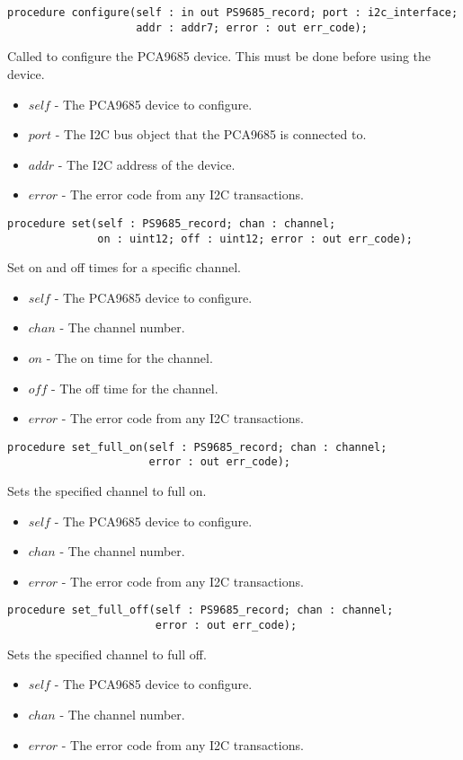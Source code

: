 \documentclass[10pt, openany]{book}
\begin{document}
\begin{lstlisting}
procedure configure(self : in out PS9685_record; port : i2c_interface;
                    addr : addr7; error : out err_code);
\end{lstlisting}
Called to configure the PCA9685 device.  This must be done before using the device.
\begin{itemize}
  \item $self$ - The PCA9685 device to configure.
  \item $port$ - The I2C bus object that the PCA9685 is connected to.
  \item $addr$ - The I2C address of the device.
  \item $error$ - The error code from any I2C transactions.
\end{itemize}

\begin{lstlisting}
procedure set(self : PS9685_record; chan : channel;
              on : uint12; off : uint12; error : out err_code);
\end{lstlisting}
Set on and off times for a specific channel.
\begin{itemize}
  \item $self$ - The PCA9685 device to configure.
  \item $chan$ - The channel number.
  \item $on$ - The on time for the channel.
  \item $off$ - The off time for the channel.
  \item $error$ - The error code from any I2C transactions.
\end{itemize}

\begin{lstlisting}
procedure set_full_on(self : PS9685_record; chan : channel;
                      error : out err_code);
\end{lstlisting}
Sets the specified channel to full on.
\begin{itemize}
  \item $self$ - The PCA9685 device to configure.
  \item $chan$ - The channel number.
  \item $error$ - The error code from any I2C transactions.
\end{itemize}

\begin{lstlisting}
procedure set_full_off(self : PS9685_record; chan : channel;
                       error : out err_code);
\end{lstlisting}
Sets the specified channel to full off.
\begin{itemize}
  \item $self$ - The PCA9685 device to configure.
  \item $chan$ - The channel number.
  \item $error$ - The error code from any I2C transactions.
\end{itemize}
\end{document}
